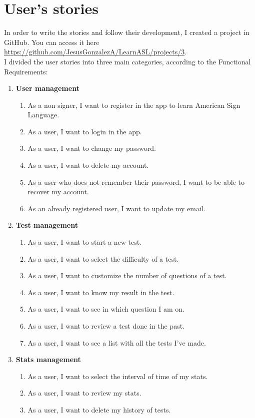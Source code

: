 \section{User's stories}
In order to write the stories and follow their development, I created a project in GitHub. You can access it here \url{https://github.com/JesusGonzalezA/LearnASL/projects/3}. \\

I divided the user stories into three main categories, according to the Functional Requirements:
\begin{enumerate}[label=\textbf{US\_\arabic*}, align=left, leftmargin=*]
    \item \textbf{User management} 
        \begin{enumerate}[label=\textbf{\theenumi.\arabic*}, align=left, leftmargin=*]
            \item As a non signer, I want to register in the app to learn American Sign Language.
            \item As a user, I want to login in the app.
            \item As a user, I want to change my password.
            \item As a user, I want to delete my account.
            \item As a user who does not remember their password, I want to be able to recover my account.
            \item As an already registered user, I want to update my email.
        \end{enumerate}
    \item \textbf{Test management} 
        \begin{enumerate}[label=\textbf{\theenumi.\arabic*}, align=left, leftmargin=*]
            \item As a user, I want to start a new test.
            \item As a user, I want to select the difficulty of a test.
            \item As a user, I want to customize the number of questions of a test.
            \item As a user, I want to know my result in the test.
            \item As a user, I want to see in which question I am on.
            \item As a user, I want to review a test done in the past.
            \item As a user, I want to see a list with all the tests I've made.
        \end{enumerate}
    \item \textbf{Stats management}
        \begin{enumerate}[label=\textbf{\theenumi.\arabic*}, align=left, leftmargin=*]
            \item As a user, I want to select the interval of time of my stats.
            \item As a user, I want to review my stats.
            \item As a user, I want to delete my history of tests.
        \end{enumerate}
\end{enumerate}

